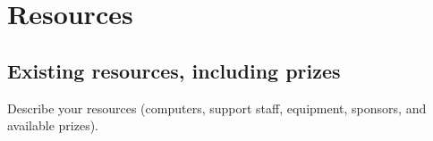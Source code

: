 \documentclass[11pt, oneside]{article}
\begin{document}
\section{Resources}
\subsection{Existing resources, including prizes}

Describe your resources (computers, support staff, equipment, sponsors, and available prizes).



%

\end{document}
